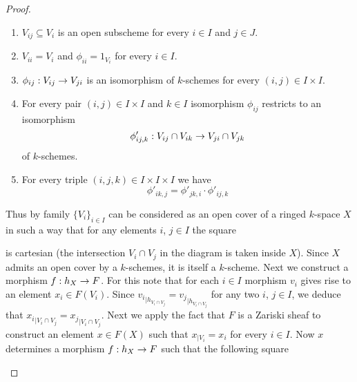 \begin{proof}
\begin{enumerate}[label=\textbf{(\arabic*)}, leftmargin=1.5em]
\item $V_{ij}\subseteq V_i$ is an open subscheme for every $i\in I$ and $j\in J$.
\item $V_{ii}=V_i$ and $\phi_{ii}=1_{V_i}$ for every $i\in I$.
\item $\phi_{ij}:V_{ij}\ra V_{ji}$ is an isomorphism of $k$-schemes for every $(i,j)\in I\times I$.
\item For every pair $(i,j)\in I\times I$ and $k\in I$ isomorphism $\phi_{ij}$ restricts to an isomorphism 
$$\phi'_{ij,k}:V_{ij}\cap V_{ik}\ra V_{ji}\cap V_{jk}$$
of $k$-schemes.
\item For every triple $(i,j,k)\in I\times I\times I$ we have
$$\phi'_{ik,j}=\phi'_{jk,i}\cdot \phi'_{ij,k}$$
\end{enumerate}
Thus by {\cite[Chapitre 0, 4.1.7]{EGA1new}} family $\big\{V_i\big\}_{i\in I}$ can be considered as an open cover of a ringed $k$-space $X$ in such a way that for any elements $i$, $j\in I$ the square
\begin{center}
\end{center}
is cartesian (the intersection $V_i\cap V_j$ in the diagram is taken inside $X$). Since $X$ admits an open cover by a $k$-schemes, it is itself a $k$-scheme. Next we construct a morphism $f:h_X\ra F$. For this note that for each $i\in I$ morphism $v_i$ gives rise to an element $x_i\in F(V_i)$. Since ${v_i}_{\mid h_{V_i\cap V_j}}={v_j}_{\mid h_{V_i\cap V_j}}$ for any two $i$, $j\in I$, we deduce that ${x_i}_{\mid V_i\cap V_j}={x_j}_{\mid V_i\cap V_j}$. Next we apply the fact that $F$ is a Zariski sheaf to construct an element $x\in F(X)$ such that $x_{\mid V_i}=x_i$ for every $i\in I$. Now $x$ determines a morphism $f:h_X\ra F$ such that the following square
\begin{center}
\begin{tikzpicture}

\end{tikzpicture}
\end{center}
\end{proof}
